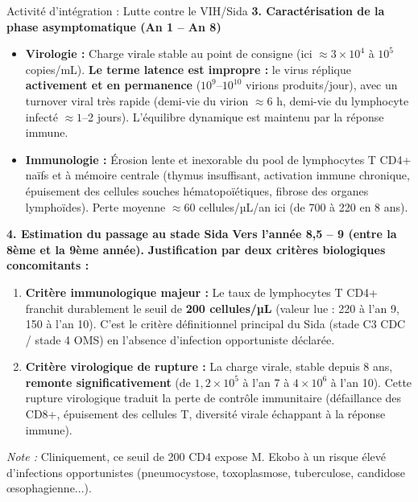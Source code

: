 \documentclass[11pt]{article}
\begin{document}
\begin{exoresolu}{Activité d'intégration : Lutte contre le VIH/Sida}
\textbf{3. Caractérisation de la phase asymptomatique (An 1 -- An 8)}
\begin{itemize}
    \item \textbf{Virologie :} Charge virale stable au \og point de consigne \fg (ici $\approx 3 \times 10^4$ à $10^5$ copies/mL). \textbf{Le terme \og latence \fg est impropre :} le virus réplique \textbf{activement et en permanence} ($10^9$--$10^{10}$ virions produits/jour), avec un turnover viral très rapide (demi-vie du virion $\approx 6$ h, demi-vie du lymphocyte infecté $\approx 1$--2 jours). L'équilibre dynamique est maintenu par la réponse immune.
    \item \textbf{Immunologie :} Érosion lente et inexorable du pool de lymphocytes T CD4+ naïfs et à mémoire centrale (thymus insuffisant, activation immune chronique, épuisement des cellules souches hématopoïétiques, fibrose des organes lymphoïdes). Perte moyenne $\approx 60$ cellules/µL/an ici (de 700 à 220 en 8 ans).
\end{itemize}

\textbf{4. Estimation du passage au stade Sida}
\textbf{Vers l'année 8,5 -- 9 (entre la 8ème et la 9ème année).}
\textbf{Justification par deux critères biologiques concomitants :}
\begin{enumerate}
    \item \textbf{Critère immunologique majeur :} Le taux de lymphocytes T CD4+ franchit durablement le seuil de \textbf{200 cellules/µL} (valeur lue : 220 à l'an 9, 150 à l'an 10). C'est le critère définitionnel principal du Sida (stade C3 CDC / stade 4 OMS) en l'absence d'infection opportuniste déclarée.
    \item \textbf{Critère virologique de rupture :} La charge virale, stable depuis 8 ans, \textbf{remonte significativement} (de $1,2 \times 10^5$ à l'an 7 à $4 \times 10^6$ à l'an 10). Cette \og rupture virologique \fg traduit la perte de contrôle immunitaire (défaillance des CD8+, épuisement des cellules T, diversité virale échappant à la réponse immune).
\end{enumerate}
\emph{Note :} Cliniquement, ce seuil de 200 CD4 expose M. Ekobo à un risque élevé d'infections opportunistes (pneumocystose, toxoplasmose, tuberculose, candidose œsophagienne...).


\end{exoresolu}
\end{document}
